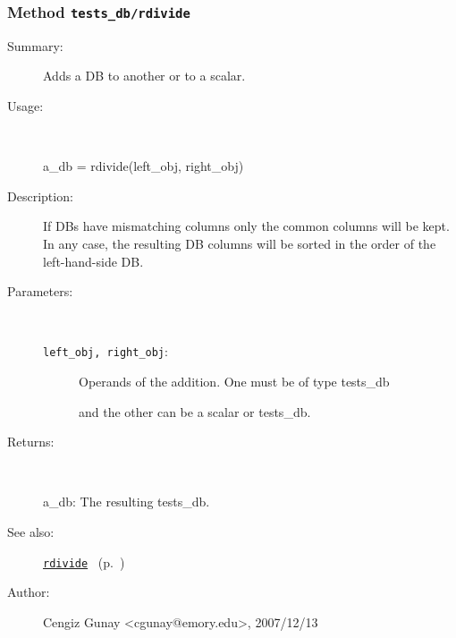 \subsubsection[Method \texttt{rdivide}]{Method \texttt{tests\_db/rdivide}}%
%
\label{ref_tests_db__rdivide}%
\hypertarget{ref_tests_db__rdivide}{}%
\begin{description}
\item[Summary:]Adds a DB to another or to a scalar.
%
\item[Usage:]~%
\begin{lyxcode}%
a\_db = rdivide(left\_obj, right\_obj)
%
\end{lyxcode}%
%
\item[Description:]%
If DBs have mismatching columns only the common columns will be kept.
 In any case, the resulting DB columns will be sorted in the order of the
 left-hand-side DB.
\item[Parameters:]~
\begin{description}%
\item[\texttt{left\_obj, right\_obj}:]
 Operands of the addition. One must be of type tests\_db

and the other can be a scalar or tests\_db.
\end{description}%
%
\item[Returns:
]~

	a\_db: The resulting tests\_db.
%
%
\item[See also:]%
\hyperlink{ref_rdivide}{\texttt{rdivide}}%
\ (p.~\pageref{ref_rdivide})%
%
%
\item[Author:]%
Cengiz Gunay <cgunay@emory.edu>, 2007/12/13
%
\end{description}
\methodline%

